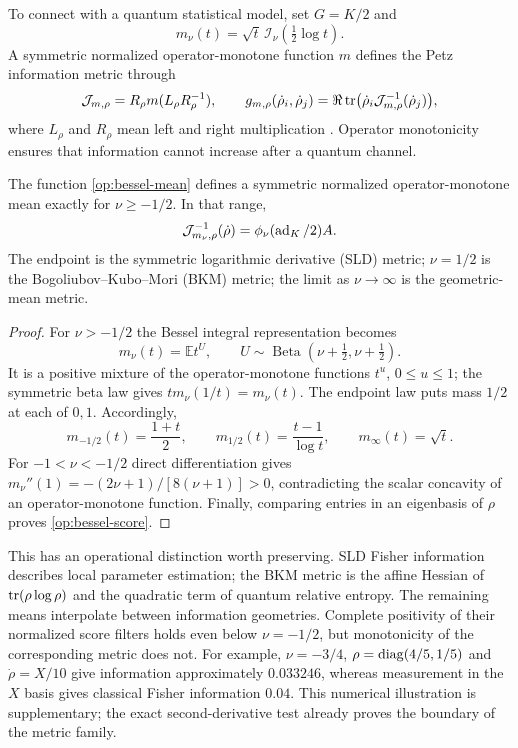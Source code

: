 To connect with a quantum statistical model, set $G=K/2$ and
\begin{equation}
 m_\nu(t)=\sqrt t\,\mathcal I_\nu(\tfrac12\log t).
 \label{op:bessel-mean}
\end{equation}
A symmetric normalized operator-monotone function $m$ defines the Petz
information metric through
\[
 \mathcal J_{m,\rho}=R_\rho m(L_\rho R_\rho^{-1}),\qquad
 g_{m,\rho}(\dot\rho_i,\dot\rho_j)
 =\Re\operatorname{tr}\bigl(\dot\rho_i\mathcal J_{m,\rho}^{-1}(\dot\rho_j)\bigr),
\]
where $L_\rho$ and $R_\rho$ mean left and right multiplication
\citep{Petz1996,HiaiKosakiPetzRuskai2013}. Operator monotonicity ensures
that information cannot increase after a quantum channel.

\begin{proposition}
\label{op:metric-range}
The function \eqref{op:bessel-mean} defines a symmetric normalized
operator-monotone mean exactly for $\nu\ge-1/2$. In that range,
\begin{equation}
 \mathcal J_{m_\nu,\rho}^{-1}(\dot\rho)
 =\phi_\nu(\operatorname{ad}_K/2)A.
 \label{op:bessel-score}
\end{equation}
The endpoint is the symmetric logarithmic derivative (SLD) metric;
$\nu=1/2$ is the Bogoliubov--Kubo--Mori (BKM) metric; the limit as
$\nu\to\infty$ is the geometric-mean metric.
\end{proposition}

\begin{proof}
For $\nu>-1/2$ the Bessel integral representation becomes
\[
 m_\nu(t)=\mathbb E t^U,\qquad
 U\sim\operatorname{Beta}(\nu+\tfrac12,\nu+\tfrac12).
\]
It is a positive mixture of the operator-monotone functions $t^u$,
$0\le u\le1$; the symmetric beta law gives $tm_\nu(1/t)=m_\nu(t)$.
The endpoint law puts mass $1/2$ at each of $0,1$. Accordingly,
\[
 m_{-1/2}(t)=\frac{1+t}2,\qquad
 m_{1/2}(t)=\frac{t-1}{\log t},\qquad
 m_\infty(t)=\sqrt t.
\]
For $-1<\nu<-1/2$ direct differentiation gives
$m_\nu''(1)=-(2\nu+1)/[8(\nu+1)]>0$, contradicting the scalar concavity
of an operator-monotone function. Finally, comparing entries in an
eigenbasis of $\rho$ proves \eqref{op:bessel-score}.
\end{proof}

This has an operational distinction worth preserving. SLD Fisher
information describes local parameter estimation; the BKM metric is the
affine Hessian of $\operatorname{tr}(\rho\log\rho)$ and the quadratic term of quantum
relative entropy. The remaining means interpolate between information
geometries. Complete positivity of their normalized score filters holds
even below $\nu=-1/2$, but monotonicity of the corresponding metric does
not. For example, $\nu=-3/4$, $\rho=\operatorname{diag}(4/5,1/5)$ and
$\dot\rho=X/10$ give information approximately $0.033246$, whereas
measurement in the $X$ basis gives classical Fisher information $0.04$.
This numerical illustration is supplementary; the exact second-derivative
test already proves the boundary of the metric family.

